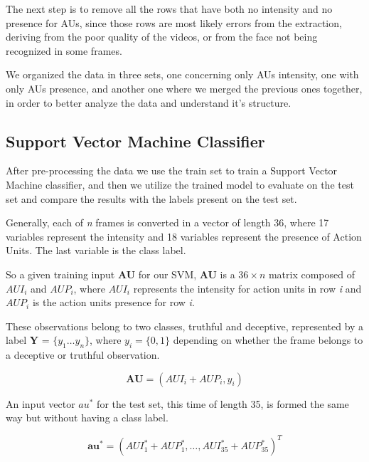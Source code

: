 The next step is to remove all the rows that have both no intensity and no presence for AUs, since those rows are most likely errors from the extraction, deriving from the poor quality of the videos, or from the face not being recognized in some frames.

We organized the data in three sets, one concerning only AUs intensity, one with only AUs presence, and another one where we merged the previous ones together, in order to better analyze the data and understand it's structure.

\subsection{Support Vector Machine Classifier}


After pre-processing the data we use the train set to train a Support Vector Machine classifier, and then we utilize the trained model to evaluate on the test set and compare the results with the labels present on the test set.

Generally, each of \textit{n} frames is converted in a vector of length 36, where 17 variables represent the intensity and 18 variables represent the presence of Action Units. The last variable is the class label.

So a given training input \textbf{AU} for our SVM, \textbf{AU} is a $36 \times n$ matrix composed of $AUI_i$ and $AUP_i$, where $AUI_i$ represents the intensity for action units in row \textit{i} and $AUP_i$ is the action units presence for row \textit{i}. 

These observations belong to two classes, truthful and deceptive, represented by a label \textbf{Y} = $\{y_1 \dots y_n\}$, where $y_i = \{0,1\}$ depending on whether the frame belongs to a deceptive or truthful observation.

\begin{equation}
	\mathbf{AU} = (AUI_i + AUP_i, y_i)
\end{equation}

An input vector $au^*$ for the test set, this time of length 35, is formed the same way but without having a class label.

\begin{equation}
	\mathbf{au^*} = (AUI^*_1 + AUP^*_1, \dots, AUI^*_{35} + AUP^*_{35})^T
\end{equation}

